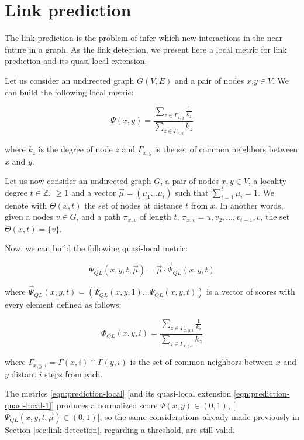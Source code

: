 \section{Link prediction}
\label{sec:link-prediction}

The link prediction is the problem of infer which new interactions in the near future in a graph.
As the link detection, we present here a local metric for link prediction and its quasi-local extension.

Let us consider an undirected graph $G(V,E)$ and a pair of nodes $x$,$y\in V$. We can build the following local metric:

\begin{equation}
\label{eqn:prediction-local}
\Psi(x,y)=
\frac{\sum\limits_{z\in\Gamma_{x,y}}\frac{1}{k_{z}}}
{\sum\limits_{z\in\Gamma_{x,y}}k_{z}}
\end{equation}

where $k_{z}$ is the degree of node $z$ and $\Gamma_{x,y}$ is the set of common neighbors between $x$ and $y$. 

Let us now consider an undirected graph $G$, a pair of nodes $x,y\in V$, a locality degree $t\in \mathbb{Z}$, $\geq 1$ and a vector $\vec{\mu}=(\mu_{1}\ldots\mu_{t})$ such that $\sum_{i=1}^{t}\mu_{i}=1$. We denote with $\Theta(x,t)$ the set of nodes at distance $t$ from $x$. In another words, given a nodes $v \in G$, and a path $\pi_{x,v}$ of length $t$, $\pi_{x,v} = u,v_{2},...,v_{t-1},v$, the set $\Theta(x,t) = \{v\}$.

Now, we can build the following quasi-local metric:

\begin{equation}
\label{eqn:prediction-quasi-local-1}
\Psi_{QL}(x,y,t,\vec{\mu})=\vec{\mu}\cdot\vec{\Psi}_{QL}(x,y,t)
\end{equation}


where $\vec{\Psi}_{QL}(x,y,t)=(\Psi_{QL}(x,y,1)\ldots\Psi_{QL}(x,y,t))$ is a vector of scores with every element defined as follows:

\begin{equation}
\label{eqn:prediction-quasi-local-2}
\Phi_{QL}(x,y,i)=
\frac{\sum\limits_{z\in \Gamma_{x,y,i}}\frac{1}{k_{z}}}
{\sum\limits_{z\in\Gamma_{x,y,i}}k_{z}}
\end{equation}

where $\Gamma_{x,y,i} = \Gamma(x,i) \cap \Gamma(y,i)$ is the set of common neighbors between $x$ and $y$ distant $i$ steps from each.

The metrics \ref{eqn:prediction-local} [and its quasi-local extension \ref{eqn:prediction-quasi-local-1}] produces a normalized score $\Psi(x,y) \in (0,1)$, [$\Psi_{QL}(x,y,t,\vec{\mu}) \in (0,1)$], so the same considerations already made previously in Section \ref{sec:link-detection}, regarding a threshold, are still valid. 



